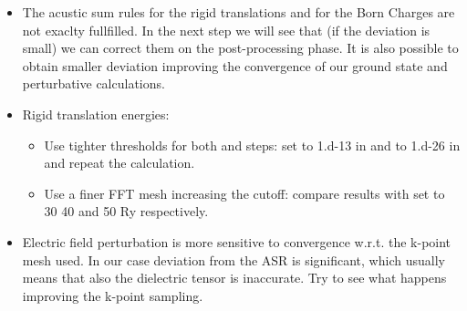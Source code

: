 \documentclass[landscape]{foils}
\begin{document}
\begin{itemize}

\item The acustic sum rules for the rigid translations and for the Born Charges are not exaclty fullfilled. In the  next step we will see that 
	(if the deviation is small) we can correct them on the post-processing phase. It is also possible to obtain smaller deviation improving 
		the convergence of our ground state and perturbative calculations. 
	\item {Rigid translation energies:
	\begin{itemize}
		\item Use tighter thresholds for both  and  steps: set  to 1.d-13 
			in  and  to 1.d-26 
			in  and repeat the calculation. 
		\item Use a finer FFT mesh increasing the cutoff: compare results with  set to 30 40 and 50 Ry respectively.  
	\end{itemize}
		}
	\item {Electric field perturbation is more sensitive to convergence w.r.t. the  k-point mesh used. In our case deviation from the
		ASR is significant, which usually means that also the dielectric tensor is inaccurate. Try to see what happens improving the k-point 
		sampling. 
		}
\end{itemize}
\end{document}

